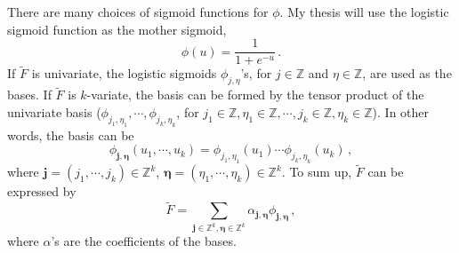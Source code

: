 There are many choices of sigmoid functions for $\phi$.
My thesis will use the logistic sigmoid function as the mother sigmoid,
\begin{equation}
    \phi(u) = \frac{1}{1+ e^{-u}}\,.
    \label{eqn: logistic sigmoid}
\end{equation}
If $\tilde{F}$ is univariate, the logistic sigmoids $\phi_{j,\eta}$'s, for
$j\in \mathbb{Z}$ and $\eta \in \mathbb{Z}$, are used as the bases.
If $\tilde{F}$ is $k$-variate, the basis can be formed by the tensor product 
of the univariate basis \cite{functional analysis} 
($\phi_{j_1,\eta_1}, \cdots, \phi_{j_k, \eta_k}$, for
$j_1\in \mathbb{Z}, \eta_1\in \mathbb{Z} , \cdots, j_k \in \mathbb{Z}, \eta_k \in \mathbb{Z}$).
In other words, the basis can be
\begin{equation}
    \phi_{\boldsymbol{j}, \boldsymbol{\eta}} (u_1, \cdots, u_k) = \phi_{j_1, \eta_1}(u_1)\cdots
    \phi_{j_k, \eta_k}(u_k)\,,
    \label{eqn: tensor basis}
\end{equation}
where $\boldsymbol{j}=(j_1, \cdots, j_k)\in \mathbb{Z}^k$, 
$\boldsymbol{\eta} = (\eta_1, \cdots, \eta_k) \in \mathbb{Z}^k$. To sum up,
$\tilde{F}$ can be expressed by
\begin{equation}
    \tilde{F} = \sum_{\boldsymbol{j}\in \mathbb{Z}^k, \boldsymbol{\eta}\in \mathbb{Z}^k} 
                       \alpha_{\boldsymbol{j}, \boldsymbol{\eta}}
                       \phi_{\boldsymbol{j}, \boldsymbol{\eta}}\,,
    \label{eqn: linear expansion}
\end{equation}
where $\alpha$'s are the coefficients of the bases.\\

